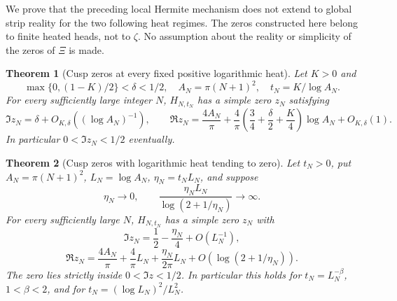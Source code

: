 \documentclass[11pt]{article}
\newtheorem{theorem}{Theorem}
\theoremstyle{remark}\newtheorem{remark}[theorem]{Remark}
\begin{document}
We prove that the preceding local Hermite mechanism does not extend to
global strip reality for the two following heat regimes. The zeros
constructed here belong to finite heated heads, not to $\zeta$.
No assumption about the reality or simplicity of the zeros of $\Xi$
is made.

\begin{theorem}[Cusp zeros at every fixed positive logarithmic heat]
\label{thm:cusp-fixed-logheat}
Let $K>0$ and
\[
 \max\{0,(1-K)/2\}<\delta<1/2,
 \quad A_N=\pi(N+1)^2,\quad t_N=K/\log A_N.
\]
For every sufficiently large integer $N$, $H_{N,t_N}$ has a simple zero
$z_N$ satisfying
\[
 \Im z_N=\delta+O_{K,\delta}((\log A_N)^{-1}),
 \qquad
 \Re z_N=\frac{4A_N}{\pi}
  +\frac4\pi\left(\frac34+\frac\delta2+\frac K4\right)\log A_N
  +O_{K,\delta}(1).                                    \tag{CZ1}
\]
In particular $0<\Im z_N<1/2$ eventually.
\end{theorem}

\begin{theorem}[Cusp zeros with logarithmic heat tending to zero]
\label{thm:cusp-small-logheat}
Let $t_N>0$, put $A_N=\pi(N+1)^2$, $L_N=\log A_N$,
$\eta_N=t_NL_N$, and suppose
\[
 \eta_N\longrightarrow0,\qquad
 \frac{\eta_NL_N}{\log(2+1/\eta_N)}\longrightarrow\infty. \tag{CZ2}
\]
For every sufficiently large $N$, $H_{N,t_N}$ has a simple zero $z_N$
with
\[
 \Im z_N=\frac12-\frac{\eta_N}4+O(L_N^{-1}),
\]
\[
 \Re z_N=\frac{4A_N}{\pi}+\frac4\pi L_N
       +\frac{\eta_N}{2\pi}L_N
       +O(\log(2+1/\eta_N)).                           \tag{CZ3}
\]
The zero lies strictly inside $0<\Im z<1/2$.
In particular this holds for $t_N=L_N^{-\beta}$, $1<\beta<2$,
and for $t_N=(\log L_N)^2/L_N^2$.
\end{theorem}
\end{document}
